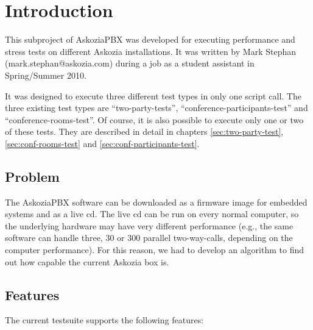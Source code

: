 \section{Introduction}
\label{sec:introduction}

This subproject of AskoziaPBX was developed for executing performance and stress tests on different Askozia installations.
It was written by Mark Stephan \newline (mark.stephan@askozia.com) during a job as a student assistant in Spring/Summer 2010. 

It was designed to execute three different test types in only one script call. The three existing test types are
``two-party-tests'', ``conference-participants-test'' and ``conference-rooms-test''. Of course, it is also possible
to execute only one or two of these tests. They are described in detail in chapters \ref{sec:two-party-test},
\ref{sec:conf-rooms-test} and \ref{sec:conf-participants-test}.

\subsection{Problem}%
The AskoziaPBX software can be downloaded as a firmware image for embedded systems and as a live cd.
The live cd can be run on every normal computer, so the underlying hardware may have very different
performance (e.g., the same software can handle three, 30 or 300 parallel two-way-calls,
depending on the computer performance). For this reason, we had to develop an algorithm to find out
how capable the current Askozia box is.
 
\subsection{Features}%
The current testsuite supports the following features:

